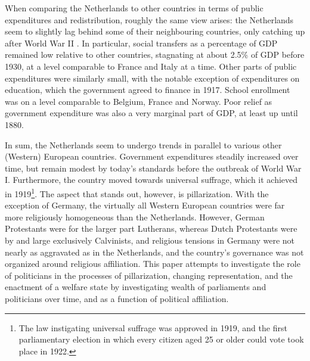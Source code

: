When comparing the Netherlands to other countries in terms of public expenditures and redistribution, roughly the same view arises: the Netherlands seem to slightly lag behind some of their neighbouring countries, only catching up after World War II \autocite{lindert2004growing}. In particular, social transfers as a percentage of GDP remained low relative to other countries, stagnating at about 2.5\% of GDP before 1930, at a level comparable to France and Italy at a time. Other parts of public expenditures were similarly small, with the notable exception of expenditures on education, which the government agreed to finance in 1917. School enrollment was on a level comparable to Belgium, France and Norway. Poor relief as government expenditure was also a very marginal part of GDP, at least up until 1880. \autocite{van2000eenheiddstaat, lindert2004growing}

In sum, the Netherlands seem to undergo trends in parallel to various other (Western) European countries. Government expenditures steadily increased over time, but remain modest by today's standards before the outbreak of World War I. Furthermore, the country moved towards universal suffrage, which it achieved in 1919\footnote{The law instigating universal suffrage was approved in 1919, and the first parliamentary election in which every citizen aged 25 or older could vote took place in 1922.}. The aspect that stands out, however, is pillarization. With the exception of Germany, the virtually all Western European countries were far more religiously homogeneous than the Netherlands. However, German Protestants were for the larger part Lutherans, whereas Dutch Protestants were by and large exclusively Calvinists, and religious tensions in Germany were not nearly as aggravated as in the Netherlands, and the country's governance was not organized around religious affiliation. This paper attempts to investigate the role of politicians in the processes of pillarization, changing representation, and the enactment of a welfare state by investigating wealth of parliaments and politicians over time, and as a function of political affiliation.

